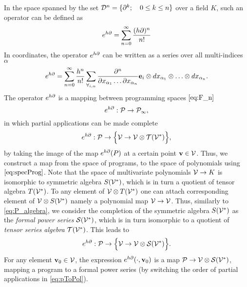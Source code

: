 In the space spanned by the set $\mathcal{D}^n=\{\partial^k;\quad 0\le k\le n\}$ over a field $K$, such an operator can be defined as
 \begin{equation*}
  e^{h\partial}=\sum\limits_{n=0}^{\infty}\frac{(h\partial)^n}{n!}
 \end{equation*}
 In coordinates, the operator $e^{h\partial}$ can be written as a
 series over all multi-indices $\alpha$
 \begin{equation}\label{eq:e^d}
  e^{h\partial}=\sum\limits_{n=0}^{\infty}\frac{h^n}{n!}\sum_{\forall_{i,\alpha}}\frac{\partial^n}{\partial
        x_{\alpha_1}\ldots \partial x_{\alpha_n}}\mathbf{e}_i\otimes
      dx_{\alpha_1}\otimes\ldots \otimes dx_{\alpha_n}.
 \end{equation}
The operator $e^{h\partial}$ is a mapping between programming spaces $\eqref{eq:F_n}$
 \begin{equation*}
  e^{h\partial}:\mathcal{P}\to\mathcal{P}_\infty,
 \end{equation*}
in which partial applications can be made complete
  \begin{equation}\label{eq:specProg}
    e^{h\partial}:\mathcal{P}\to \Big\{\mathcal{V}\to \mathcal{V}\otimes \mathcal{T}(\mathcal{V}^*)\Big\},
  \end{equation}
by taking the image of the map $e^{h\partial}(P)$ at a certain point $\mathbf{v}\in \mathcal{V}$.  
Thus, we construct a map from the space of programs,
to the space of polynomials using  $\eqref{eq:specProg}$. Note that the space of
multivariate polynomials 
$\mathcal{V}\to K$ is isomorphic to symmetric algebra $S(\mathcal{V}^*)$, which is in turn a
quotient of tensor algebra $T(\mathcal{V}^*)$.
To any element of
 $\mathcal{V}\otimes T(\mathcal{V}^*)$ one can attach corresponding element of $\mathcal{V}\otimes S(\mathcal{V}^*)$
 namely a polynomial map  $\mathcal{V}\to \mathcal{V}$. Thus, similarly to \eqref{eq:P_algebra}, we consider the completion of the symmetric algebra $S(\mathcal{V}^*)$ as the \emph{formal power series} $\mathcal{S}(\mathcal{V}^{*})$, which is in turn isomorphic to a quotient of \emph{tensor series algebra} $\mathcal{T}(\mathcal{V}^*)$. This leads to 
 \begin{equation}\label{eq:pToPol}
  e^{h\partial}:\mathcal{P}\to \Big\{\mathcal{V}\to \mathcal{V}\otimes \mathcal{S}(\mathcal{V}^*)\Big\}.
 \end{equation}
 For any element $\mathbf{v}_0\in \mathcal{V}$, the expression $e^{h\partial}(\cdot,\mathbf{v}_0)$ is a map $\mathcal{P}\to
 \mathcal{V}\otimes \mathcal{S}(\mathcal{V}^*)$, mapping a program to a formal power series (by switching the order of partial applications in \eqref{eq:pToPol}).

